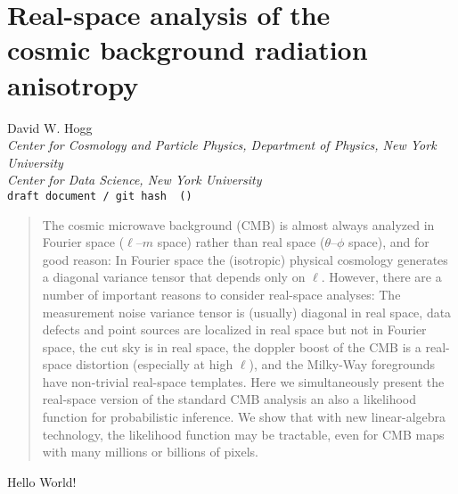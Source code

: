 \documentclass[12pt]{article}
\begin{document}
\section*{Real-space analysis of the \\ cosmic background radiation anisotropy}
\noindent
David W. Hogg\\
{\footnotesize
\textsl{Center for Cosmology and Particle Physics, Department of Physics, New York University}\\
\textsl{Center for Data Science, New York University}\\
\texttt{draft document / git hash \githash\ (\gitdate)}}

\begin{abstract}
The cosmic microwave background (CMB) is almost always analyzed
in Fourier space ($\ell$--$m$ space)
rather than real space ($\theta$--$\phi$ space), and for good reason:
In Fourier space the (isotropic) physical cosmology generates a
diagonal variance tensor that depends only on $\ell$.
However, there are a number of important reasons to consider
real-space analyses:
The measurement noise variance tensor is (usually) diagonal in real space,
data defects and point sources are localized in real space but not in Fourier space,
the cut sky is in real space, the doppler boost of the CMB
is a real-space distortion (especially at high $\ell$), and the
Milky-Way foregrounds have non-trivial real-space templates.
Here we simultaneously present the real-space version of the standard
CMB analysis an also a likelihood function for probabilistic
inference.
We show that with new linear-algebra technology, the likelihood
function may be tractable, even for CMB maps with many millions or
billions of pixels.
\end{abstract}

Hello World!
\end{document}

